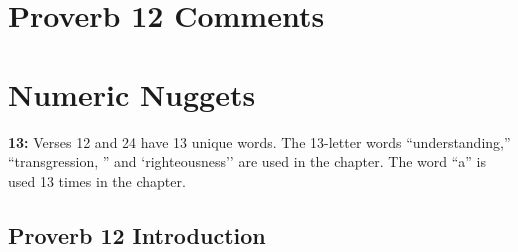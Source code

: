 \section{Proverb 12 Comments}

\section{Numeric Nuggets}
\textbf{13:} Verses 12 and 24 have 13 unique words. The 13-letter words ``understanding,'' ``transgression, '' and `righteousness'' are used in the chapter. The word ``a'' is used 13 times in the chapter.

\subsection{Proverb 12 Introduction}

